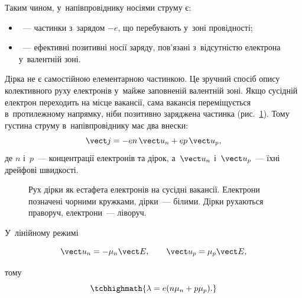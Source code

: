 Таким чином, у~напівпровіднику носіями струму є:
\begin{itemize}
	\item {}~--- частинки з~зарядом $-e$, що перебувають у~зоні
	  провідності;
	\item {}~--- ефективні позитивні носії заряду, пов'язані з~відсутністю
	  електрона у~валентній зоні.
\end{itemize}

Дірка не є самостійною елементарною частинкою. Це зручний спосіб опису колективного руху
електронів у~майже заповненій валентній зоні. Якщо сусідній електрон переходить на місце
вакансії, сама вакансія переміщується в~протилежному напрямку, ніби позитивно заряджена
частинка (рис.~\ref{pic:HoleMotion}). Тому густина струму в~напівпровіднику має два
внески:
\begin{equation}\label{eq:SemiconductorCurrent}
	\vect j =
	-e n\,\vect u_n
	+e p\,\vect u_p,
\end{equation}
де $n$ і~$p$~--- концентрації електронів та дірок, а~$\vect u_n$ і~$\vect u_p$~--- їхні
дрейфові швидкості.

\begin{figure}[h!]\centering
	\caption{Рух дірки як естафета електронів на сусідні вакансії. Електрони позначені
	чорними кружками, дірки~--- білими. Дірки рухаються праворуч, електрони~---
	ліворуч.\label{pic:HoleMotion}}
\end{figure}

У~лінійному режимі

\begin{equation*}
	\vect u_n=-\mu_n\vect E,
	\qquad
	\vect u_p=\mu_p\vect E,
\end{equation*}

тому
\begin{equation}\label{eq:SemiconductorConductivity}
	\tcbhighmath{
		\lambda=e(n\mu_n+p\mu_p).
	}
\end{equation}


